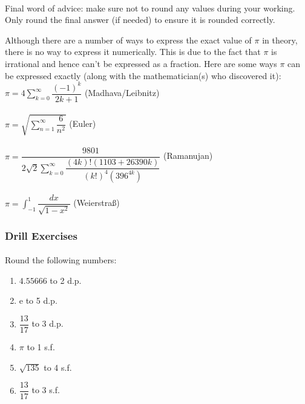 \documentclass[12pt, a4paper, titlepage, twoside]{article}
\newcommand*{\e}{\textrm{e}}
\begin{document}
	\paragraph{}
	Final word of advice: make sure not to round any values during your working. Only round the final answer (if needed) to ensure
	it is rounded correctly.\\
	
	\begin{fr}[Finding $\pi$]
		Although there are a number of ways to express the exact value of $\pi$ in theory, there is no way to express it numerically.
		This is due to the fact that $\pi$ is irrational and hence can't be expressed as a fraction. Here are some ways $\pi$ can
		be expressed exactly (along with the mathematician(s) who discovered it):\\
		
		\hfill $\displaystyle \pi = 4 \sum_{k=0}^{\infty} \dfrac{(-1)^k}{2k+1}$ \hfill (Madhava/Leibnitz)\\ \\
		
		\hfill $\displaystyle \pi = \sqrt{\sum_{n=1}^{\infty} \dfrac{6}{n^2}}$ \hfill (Euler)\\ \\
		
		\hfill $\displaystyle \pi = \dfrac{9801}{2\sqrt{2} \displaystyle\sum_{k=0}^{\infty} \dfrac{(4k)!(1103 + 26390k)}
		{(k!)^4 (396^{4k})}}$ \hfill (Ramanujan)\\ \\
		
		\hfill $\displaystyle \pi = \int_{-1}^1 \dfrac{dx}{\sqrt{1-x^2}}$ 
		\hfill(Weierstra{\ss}) 
	\end{fr}
	
	\subsubsection*{Drill Exercises}
	
	\paragraph{}
	 Round the following numbers:
	
	\begin{multicols}{2}
		\begin{enumerate}[label=\textbf{(\alph*)}]
			\item $4.55666$ to 2 d.p.
			\item $\e$ to 5 d.p.
			\item $\dfrac{13}{17}$ to 3 d.p.
			\item $\pi$ to 1 s.f.
			\item $\sqrt{135}$ to 4 s.f.
			\item $\dfrac{13}{17}$ to 3 s.f.
		\end{enumerate}
	\end{multicols}
	
\end{document}
